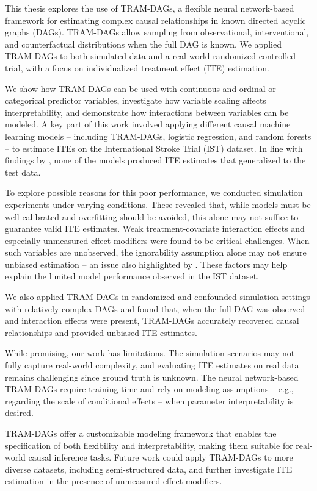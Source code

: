 \documentclass[11pt,a4paper,twoside]{book}
\begin{document}
This thesis explores the use of TRAM-DAGs, a flexible neural network-based framework for estimating complex causal relationships in known directed acyclic graphs (DAGs). TRAM-DAGs allow sampling from observational, interventional, and counterfactual distributions when the full DAG is known. We applied TRAM-DAGs to both simulated data and a real-world randomized controlled trial, with a focus on individualized treatment effect (ITE) estimation.

We show how TRAM-DAGs can be used with continuous and ordinal or categorical predictor variables, investigate how variable scaling affects interpretability, and demonstrate how interactions between variables can be modeled. A key part of this work involved applying different causal machine learning models -- including TRAM-DAGs, logistic regression, and random forests -- to estimate ITEs on the International Stroke Trial (IST) dataset. In line with findings by \citet{chen2025}, none of the models produced ITE estimates that generalized to the test data.

To explore possible reasons for this poor performance, we conducted simulation experiments under varying conditions. These revealed that, while models must be well calibrated and overfitting should be avoided, this alone may not suffice to guarantee valid ITE estimates. Weak treatment-covariate interaction effects and especially unmeasured effect modifiers were found to be critical challenges. When such variables are unobserved, the ignorability assumption alone may not ensure unbiased estimation -- an issue also highlighted by \citet{vegetabile2021}. These factors may help explain the limited model performance observed in the IST dataset.

We also applied TRAM-DAGs in randomized and confounded simulation settings with relatively complex DAGs and found that, when the full DAG was observed and interaction effects were present, TRAM-DAGs accurately recovered causal relationships and provided unbiased ITE estimates.

While promising, our work has limitations. The simulation scenarios may not fully capture real-world complexity, and evaluating ITE estimates on real data remains challenging since ground truth is unknown. The neural network-based TRAM-DAGs require training time and rely on modeling assumptions -- e.g., regarding the scale of conditional effects -- when parameter interpretability is desired.

TRAM-DAGs offer a customizable modeling framework that enables the specification of both flexibility and interpretability, making them suitable for real-world causal inference tasks. Future work could apply TRAM-DAGs to more diverse datasets, including semi-structured data, and further investigate ITE estimation in the presence of unmeasured effect modifiers.
\end{document}
